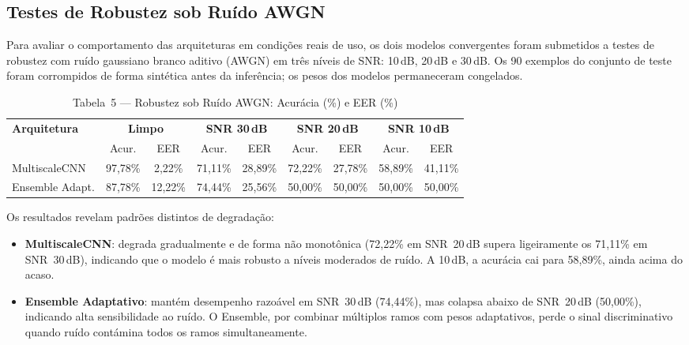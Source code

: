 \documentclass[12pt,a4paper]{article}
\begin{document}
\subsection{Testes de Robustez sob Ru\'{i}do AWGN}

Para avaliar o comportamento das arquiteturas em condi\c{c}\~{o}es reais de
uso, os dois modelos convergentes foram submetidos a testes de robustez com
ru\'{i}do gaussiano branco aditivo (AWGN) em tr\^{e}s n\'{i}veis de
SNR: 10\,dB, 20\,dB e 30\,dB.
Os 90 exemplos do conjunto de teste foram corrompidos de forma sint\'{e}tica
antes da infer\^{e}ncia; os pesos dos modelos permaneceram congelados.

\begin{table}[H]
\centering
\caption{Tabela~5 --- Robustez sob Ru\'{i}do AWGN: Acur\'{a}cia (\%) e EER (\%)}
\label{tab:robustez}
\begin{tabular}{lcccccccc}
\toprule
\multirow{2}{*}{\textbf{Arquitetura}} &
\multicolumn{2}{c}{\textbf{Limpo}} &
\multicolumn{2}{c}{\textbf{SNR 30\,dB}} &
\multicolumn{2}{c}{\textbf{SNR 20\,dB}} &
\multicolumn{2}{c}{\textbf{SNR 10\,dB}} \\
\cmidrule(lr){2-3}\cmidrule(lr){4-5}\cmidrule(lr){6-7}\cmidrule(lr){8-9}
 & Acur. & EER & Acur. & EER & Acur. & EER & Acur. & EER \\
\midrule
MultiscaleCNN
  & 97,78\% & 2,22\%
  & 71,11\% & 28,89\%
  & 72,22\% & 27,78\%
  & 58,89\% & 41,11\% \\
Ensemble Adapt.
  & 87,78\% & 12,22\%
  & 74,44\% & 25,56\%
  & 50,00\% & 50,00\%
  & 50,00\% & 50,00\% \\
\bottomrule
\end{tabular}
\end{table}

Os resultados revelam padr\~{o}es distintos de degrada\c{c}\~{a}o:

\begin{itemize}
    \item \textbf{MultiscaleCNN}: degrada gradualmente e de forma n\~{a}o
    monotônica (72,22\% em SNR~20\,dB supera ligeiramente os 71,11\% em
    SNR~30\,dB), indicando que o modelo \'{e} mais robusto a n\'{i}veis
    moderados de ru\'{i}do. A 10\,dB, a acur\'{a}cia cai para 58,89\%,
    ainda acima do acaso.
    \item \textbf{Ensemble Adaptativo}: mantém desempenho razo\'{a}vel em
    SNR~30\,dB (74,44\%), mas colapsa abaixo de SNR~20\,dB
    (50,00\%), indicando alta sensibilidade ao ru\'{i}do.
    O Ensemble, por combinar m\'{u}ltiplos ramos com pesos adaptativos,
    perde o sinal discriminativo quando ru\'{i}do cont\'{a}mina todos os
    ramos simultaneamente.
\end{itemize}
\end{document}
